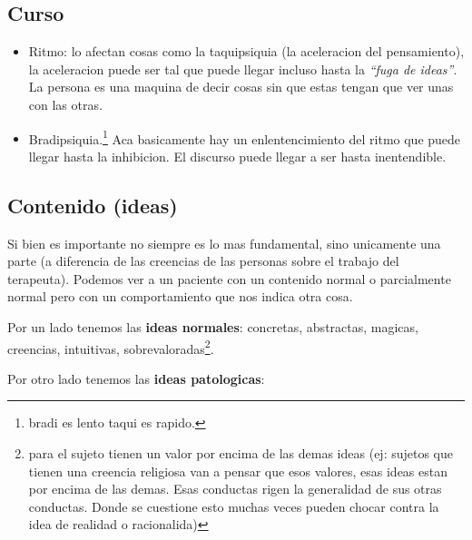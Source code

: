 \documentclass[12pt,a4paper]{article}
\begin{document}
\subsection{Curso}%
\label{ssub:curso}

\begin{itemize}

	\item Ritmo: lo afectan cosas como la taquipsiquia (la aceleracion del pensamiento), la aceleracion puede ser tal que puede llegar incluso hasta la \textit{\enquote{fuga de ideas}}. La persona es una maquina de decir cosas sin que estas tengan que ver unas con las otras. 

	\item Bradipsiquia.\footnote{bradi es lento taqui es rapido.} Aca basicamente hay un enlentencimiento del ritmo que puede llegar hasta la inhibicion. El discurso puede llegar a ser hasta inentendible. 
	
\end{itemize}


\subsection{Contenido (ideas)}%
\label{ssub:contenido_ideas_}

Si bien es importante no siempre es lo mas fundamental, sino unicamente una parte (a diferencia de las creencias de las personas sobre el trabajo del terapeuta). Podemos ver a un paciente con un contenido normal o parcialmente normal pero con un comportamiento que nos indica otra cosa. 

Por un lado tenemos las \textbf{ideas normales}: concretas, abstractas, magicas, creencias, intuitivas, sobrevaloradas\footnote{para el sujeto tienen un valor por encima de las demas ideas (ej: sujetos que tienen una creencia religiosa van a pensar que esos valores, esas ideas estan por encima de las demas. Esas conductas rigen la generalidad de sus otras conductas. Donde se cuestione esto muchas veces pueden chocar contra la idea de realidad o racionalida)}. 

Por otro lado tenemos las \textbf{ideas patologicas}: 
\end{document}
